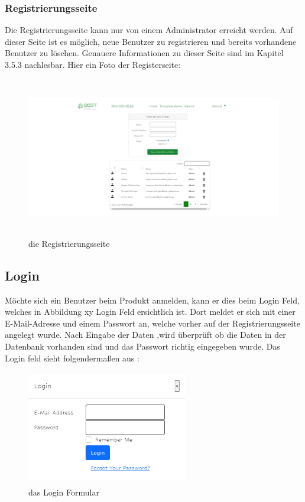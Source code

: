 \subsubsection{Registrierungsseite}
Die Registrierungsseite kann nur von einem Administrator erreicht werden. Auf dieser Seite ist es möglich, neue Benutzer zu registrieren und bereits vorhandene Benutzer zu löschen. Genauere Informationen zu dieser Seite sind im Kapitel 3.5.3 nachlesbar. Hier ein Foto der Registerseite:
\begin{figure}[h]
	\centering
	\includegraphics[height=7cm,width=14cm]{images/RegisterSeite}
	\caption{die Registrierungsseite }
	\label{fig:RegisterSeite}
\end{figure}
\newpage


\subsection{Login}
Möchte sich ein Benutzer beim Produkt anmelden, kann er dies beim Login Feld, welches in  Abbildung xy Login Feld ersichtlich ist. Dort meldet er sich mit einer E-Mail-Adresse und einem Passwort an, welche vorher auf der Registrierungsseite angelegt wurde. Nach Eingabe  der Daten ,wird überprüft ob die Daten in der Datenbank vorhanden sind und das Passwort richtig eingegeben wurde. Das Login feld sieht folgendermaßen aus :

\begin{figure}[h]
	\centering
	\includegraphics[height=5cm,width=7cm]{images/LoginFeld}
	\caption{das Login Formular}
	\label{fig:LoginFormular}
\end{figure}

